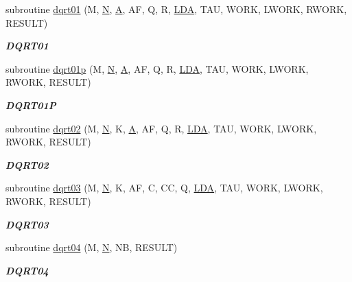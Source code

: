 \begin{DoxyCompactItemize}
subroutine \hyperlink{group__double__lin_ga364f84b5f8cf146b97e24e52e718b2ec}{dqrt01} (M, \hyperlink{polmisc_8c_a0240ac851181b84ac374872dc5434ee4}{N}, \hyperlink{classA}{A}, A\+F, Q, R, \hyperlink{example__user_8c_ae946da542ce0db94dced19b2ecefd1aa}{L\+D\+A}, T\+A\+U, W\+O\+R\+K, L\+W\+O\+R\+K, R\+W\+O\+R\+K, R\+E\+S\+U\+L\+T)
\begin{DoxyCompactList}\small\item\em {\bfseries D\+Q\+R\+T01} \end{DoxyCompactList}\item 
subroutine \hyperlink{group__double__lin_ga59871f9dd54aa4e152ac65a950825b32}{dqrt01p} (M, \hyperlink{polmisc_8c_a0240ac851181b84ac374872dc5434ee4}{N}, \hyperlink{classA}{A}, A\+F, Q, R, \hyperlink{example__user_8c_ae946da542ce0db94dced19b2ecefd1aa}{L\+D\+A}, T\+A\+U, W\+O\+R\+K, L\+W\+O\+R\+K, R\+W\+O\+R\+K, R\+E\+S\+U\+L\+T)
\begin{DoxyCompactList}\small\item\em {\bfseries D\+Q\+R\+T01\+P} \end{DoxyCompactList}\item 
subroutine \hyperlink{group__double__lin_gabdd8a668d71e1a05c97561c736da945e}{dqrt02} (M, \hyperlink{polmisc_8c_a0240ac851181b84ac374872dc5434ee4}{N}, K, \hyperlink{classA}{A}, A\+F, Q, R, \hyperlink{example__user_8c_ae946da542ce0db94dced19b2ecefd1aa}{L\+D\+A}, T\+A\+U, W\+O\+R\+K, L\+W\+O\+R\+K, R\+W\+O\+R\+K, R\+E\+S\+U\+L\+T)
\begin{DoxyCompactList}\small\item\em {\bfseries D\+Q\+R\+T02} \end{DoxyCompactList}\item 
subroutine \hyperlink{group__double__lin_ga96201d3e85a626f19fa248e07a635a97}{dqrt03} (M, \hyperlink{polmisc_8c_a0240ac851181b84ac374872dc5434ee4}{N}, K, A\+F, C, C\+C, Q, \hyperlink{example__user_8c_ae946da542ce0db94dced19b2ecefd1aa}{L\+D\+A}, T\+A\+U, W\+O\+R\+K, L\+W\+O\+R\+K, R\+W\+O\+R\+K, R\+E\+S\+U\+L\+T)
\begin{DoxyCompactList}\small\item\em {\bfseries D\+Q\+R\+T03} \end{DoxyCompactList}\item 
subroutine \hyperlink{group__double__lin_ga5ad584df09ee02db6fafb14c3650d3dc}{dqrt04} (M, \hyperlink{polmisc_8c_a0240ac851181b84ac374872dc5434ee4}{N}, N\+B, R\+E\+S\+U\+L\+T)
\begin{DoxyCompactList}\small\item\em {\bfseries D\+Q\+R\+T04} \end{DoxyCompactList}\item 

\end{DoxyCompactItemize}
